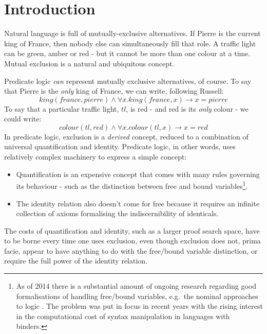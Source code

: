 \section{Introduction}\label{introduction}

Natural language is full of mutually-exclusive alternatives.
If Pierre is the current king of France, then nobody else can simultaneously fill that role.
A traffic light can be green, amber or red - but it cannot be more than one colour at a time.
Mutual exclusion is a natural and ubiquitous concept.

Predicate logic \emph{can} represent mutually exclusive alternatives, of course.
To say that Pierre is the \emph{only} king of France, we can write, following Russell:
\[
king(france, pierre) \land \forall x . king(france, x) \rightarrow x = pierre
\]
To say that a particular traffic light, $tl$, is red - and red is its \emph{only} colour - we could write:
\[
colour(tl, red) \land \forall x . colour(tl, x) \rightarrow x = red
\]
In predicate logic, exclusion is a \emph{derived} concept, reduced to 
a combination of universal quantification and identity.  Predicate
logic, in other words, uses relatively complex machinery to express a
simple concept:
\begin{itemize}

\item Quantification is an expensive concept that comes with many
  rules governing its behaviour - such as the distinction between free
  and bound variables\footnote{As of 2014 there is a substantial
    amount of ongoing research regarding good formalisations of
    handling free/bound variables, e.g.~the nominal approaches to
    logic \cite{PittsAM:nomsetnasics}. The problem was
    put in focus in recent years with the rising interest in the
    computational cost of syntax manipulation in languages with
    binders.}.

\item The identity relation also doesn't come for free because it
  requires an infinite collection of axioms formalising the
  indiscernibility of identicals.

\end{itemize}

\NI The costs of quantification and identity, such as a larger proof
search space, have to be borne every time one uses exclusion, even
though exclusion does not, prima facie, appear to have anything to do
with the free/bound variable distinction, or require the full power of 
the identity relation.

